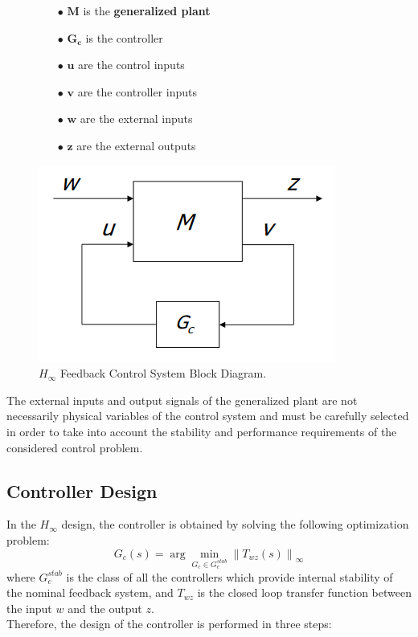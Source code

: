 \documentclass[a4paper,10pt,titlepage]{article}
\numberwithin{equation}{subsection}
\begin{document}
	\begin{figure}[H]
		\centering
		\begin{minipage}{0.5\textwidth}
			\begin{enumerate}
				\item[$\bullet$] $\bm{M}$ is the \textbf{generalized plant}
				\item[$\bullet$] $\bm{G_c}$ is the controller
				\item[$\bullet$] $\bm{u}$ are the control inputs
				\item[$\bullet$] $\bm{v}$ are the controller inputs
				\item[$\bullet$] $\bm{w}$ are the external inputs
				\item[$\bullet$] $\bm{z}$ are the external outputs
			\end{enumerate}
		\end{minipage}%
		\begin{minipage}{0.3\textwidth}
			\centering
			\includegraphics[width=\linewidth]{images/H_inf_feedback_CS.png}
			\caption{$H_\infty$ Feedback Control System Block Diagram.}
			\label{fig:image11}
		\end{minipage}
	\end{figure}
	The external inputs and output signals of the generalized plant are not necessarily physical variables of the control system and must be carefully selected in order to take into account the stability and performance requirements of the considered control problem.
	
	\subsection{Controller Design}
	In the $H_\infty$ design, the controller is obtained by solving the following optimization problem:
	\begin{equation}
		G_c(s) = \arg\min_{G_c \in G_c^{stab}} \left\lVert T_{wz}(s) \right\rVert_\infty 
	\end{equation}
	where $G_c^{stab}$ is the class of all the controllers which provide internal stability of the nominal feedback system, and $T_{wz}$ is the closed loop transfer function between the input $w$ and the output $z$.\\
	Therefore, the design of the controller is performed in three steps:
	
\end{document}
